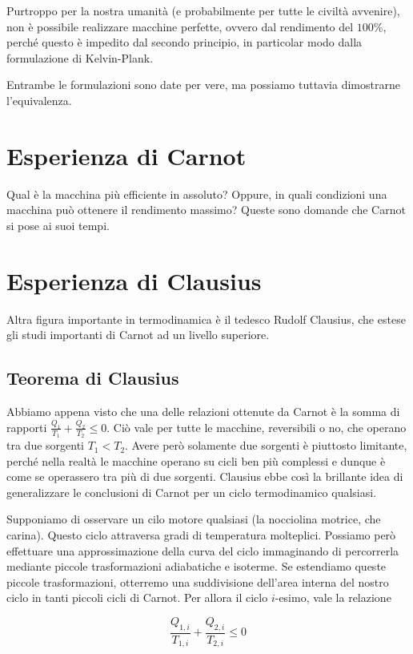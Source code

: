 \noindent Purtroppo per la nostra umanità (e probabilmente per tutte le civiltà avvenire),
non è possibile realizzare macchine perfette, ovvero dal rendimento del
$100\%$, perché questo è impedito dal secondo principio, in particolar modo
dalla formulazione di Kelvin-Plank.

Entrambe le formulazioni sono date per vere, ma possiamo tuttavia dimostrarne
l'equivalenza.

\section{Esperienza di Carnot}
Qual è la macchina più efficiente in assoluto? Oppure, in quali condizioni
una macchina può ottenere il rendimento massimo? Queste sono domande che
Carnot si pose ai suoi tempi.

\section{Esperienza di Clausius}
Altra figura importante in termodinamica è il tedesco Rudolf Clausius,
che estese gli studi importanti di Carnot ad un livello superiore.

\subsection{Teorema di Clausius}
Abbiamo appena visto che una delle relazioni ottenute da Carnot è la
somma di rapporti $\frac{Q_1}{T_1} + \frac{Q_2}{T_2} \leq 0$. Ciò vale
per tutte le macchine, reversibili o no, che operano tra due sorgenti
$T_1 < T_2$. Avere però solamente due sorgenti è piuttosto limitante,
perché nella realtà le macchine operano su cicli ben più complessi e
dunque è come se operassero tra più di due sorgenti. Clausius ebbe così
la brillante idea di generalizzare le conclusioni di Carnot per un
ciclo termodinamico qualsiasi.

Supponiamo di osservare un cilo motore qualsiasi (la nocciolina motrice,
che carina). Questo ciclo
attraversa gradi di temperatura molteplici. Possiamo però effettuare
una approssimazione della curva del ciclo immaginando di percorrerla
mediante piccole trasformazioni adiabatiche e isoterme. Se estendiamo
queste piccole trasformazioni, otterremo
una suddivisione dell'area interna del nostro ciclo in tanti piccoli
cicli di Carnot. Per allora il ciclo $i$-esimo, vale la relazione

\[ \frac{Q_{1,i}}{T_{1,i}} + \frac{Q_{2,i}}{T_{2,i}} \leq 0 \]


